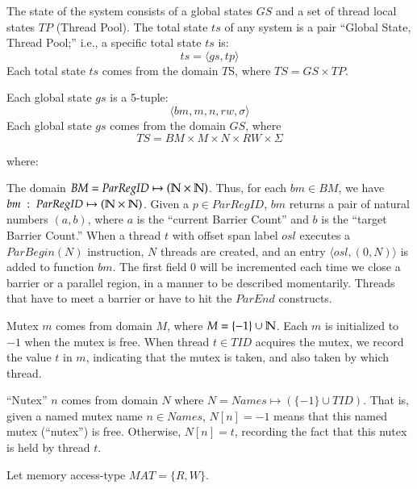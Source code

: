 The state of the system consists of a global states $GS$ and a set of thread
local states $TP$ (Thread Pool).
%
The total state $ts$ of any system is a pair ``Global State, Thread Pool;''
i.e., a specific total state $ts$ is:
\[ ts = \langle gs, tp \rangle \]
\noindent Each total state $ts$ comes from the domain $T$S, where
$TS = GS\times TP$.

\noindent Each global state $gs$ is a 5-tuple:
\[ \langle bm, m, n, rw, \sigma \rangle \]
\noindent Each global state $gs$ comes from the domain $GS$, where
\[ TS = BM\times M\times N\times RW\times \Sigma \]

\noindent where:
%
\begin{compactitem}
\item The domain $BM = ParRegID \mapsto (\mathbb{N}\times \mathbb{N})$.  Thus, for each
  $bm\in BM$, we have $bm\; :\; ParRegID \mapsto (\mathbb{N}\times \mathbb{N})$.
  Given a $p\in ParRegID$, $bm$ returns a pair of natural numbers $(a,b)$,
  where $a$ is the ``current Barrier Count'' and $b$ is the ``target Barrier
  Count.''
  When a thread $t$ with offset span label $osl$ executes a $ParBegin(N)$
  instruction, $N$ threads are created, and an entry
  $\langle osl, (0,N)\rangle$ is added to function $bm$\footnotemark.
  The first field $0$ will be incremented each time we close a barrier or a
  parallel region, in a manner to be described momentarily.
  Threads that have to meet a barrier or have to hit the $ParEnd$ constructs.

\item Mutex $m$ comes from domain $M$, where $M=\{-1\}\cup \mathbb{N}$.  Each $m$ is
  initialized to $-1$ when the mutex is free.
  When thread $t\in TID$ acquires the mutex, we record the value $t$ in $m$,
  indicating that the mutex is taken, and also taken by which thread.

\item ``Nutex'' $n$ comes from domain $N$ where
  $N = Names \mapsto (\{-1\} \cup TID)$.
  That is, given a named mutex name $n \in Names$, $N[n] = -1$ means that this
  named mutex (``nutex'') is free.
  Otherwise, $N[n] = t$, recording the fact that this nutex is held by thread
  $t$.

\item Let memory access-type $MAT=\{R,W\}$.


\end{compactitem}
